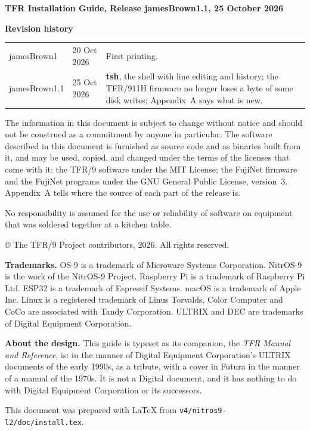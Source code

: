 \documentclass[10pt,twoside,openany]{book}
\newcommand{\release}{jamesBrown1.1}
\newcommand{\docdate}{25 October 2026}
\newcommand{\cmd}[1]{\textbf{#1}}            %
\newcommand{\file}[1]{\texttt{#1}}           %
\newcommand{\thesectname}{}
\begin{document}
{\small
\textbf{TFR Installation Guide, Release \release, \docdate}

\textbf{Revision history}\\[2pt]
\begin{tabular}{@{}l l p{3.9in}@{}}
jamesBrown1 & 20 Oct 2026 & First printing.\\
jamesBrown1.1 & 25 Oct 2026 & \cmd{tsh}, the shell with line editing and
history; the TFR/911H firmware no longer loses a byte of some disk
writes; Appendix~A says what is new.\\
\end{tabular}

The information in this document is subject to change without notice and
should not be construed as a commitment by anyone in particular. The
software described in this document is furnished as source code and as
binaries built from it, and may be used, copied, and changed under the
terms of the licenses that come with it: the TFR/9 software under the MIT
License; the FujiNet firmware and the FujiNet programs under the GNU
General Public License, version~3. Appendix~A tells where the source of
each part of the release is.

No responsibility is assumed for the use or reliability of software on
equipment that was soldered together at a kitchen table.

\copyright{} The TFR/9 Project contributors, 2026. All rights reserved.

\medskip
\textbf{Trademarks.} OS-9 is a trademark of Microware Systems Corporation.
NitrOS-9 is the work of the NitrOS-9 Project. Raspberry Pi is a trademark
of Raspberry Pi Ltd. ESP32 is a trademark of Espressif Systems. macOS is
a trademark of Apple Inc. Linux is a registered trademark of Linus
Torvalds. Color Computer and CoCo are associated with Tandy Corporation.
ULTRIX and DEC are trademarks of Digital Equipment Corporation.

\medskip
\textbf{About the design.} This guide is typeset as its companion, the
\emph{TFR Manual and Reference}, is: in the manner of Digital Equipment
Corporation's ULTRIX documents of the early 1990s, as a tribute, with a
cover in Futura in the manner of a manual of the 1970s. It is not a
Digital document, and it has nothing to do with Digital Equipment
Corporation or its successors.

\medskip
This document was prepared with \LaTeX{} from
\file{v4/nitros9-l2/doc/install.tex}.
}
\clearpage

\pagestyle{fancy}
\renewcommand{\thesectname}{Contents}
\setcounter{page}{3}
\tableofcontents
\end{document}

